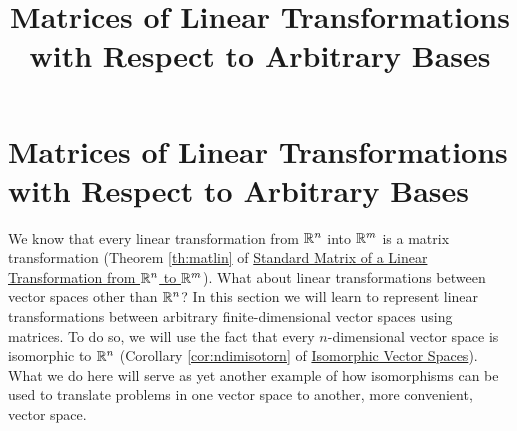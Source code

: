 \documentclass{ximera}
\title{Matrices of Linear Transformations with Respect to Arbitrary Bases} \license{CC BY-NC-SA 4.0}
\begin{document}
\begin{abstract}
 \end{abstract}
\maketitle

\section*{Matrices of Linear Transformations with Respect to Arbitrary Bases}

We know that every linear transformation from $\mathbb{R}^n$ into $\mathbb{R}^m$ is a matrix transformation  (Theorem \ref{th:matlin} of \href{https://ximera.osu.edu/oerlinalg/LinearAlgebra/LTR-0020/main}{Standard Matrix of a Linear Transformation from $\mathbb{R}^n$ to $\mathbb{R}^m$}).  What about linear transformations between vector spaces other than $\mathbb{R}^n$?  In this section we will learn to represent linear transformations between arbitrary finite-dimensional vector spaces using matrices.  To do so, we will use the fact that every $n$-dimensional vector space is isomorphic to $\mathbb{R}^n$  (Corollary \ref{cor:ndimisotorn} of \href{https://ximera.osu.edu/oerlinalg/LinearAlgebra/LTR-0060/main}{Isomorphic Vector Spaces}).  What we do here will serve as yet another example of how isomorphisms can be used to translate problems in one vector space to another, more convenient, vector space.
\end{document}
